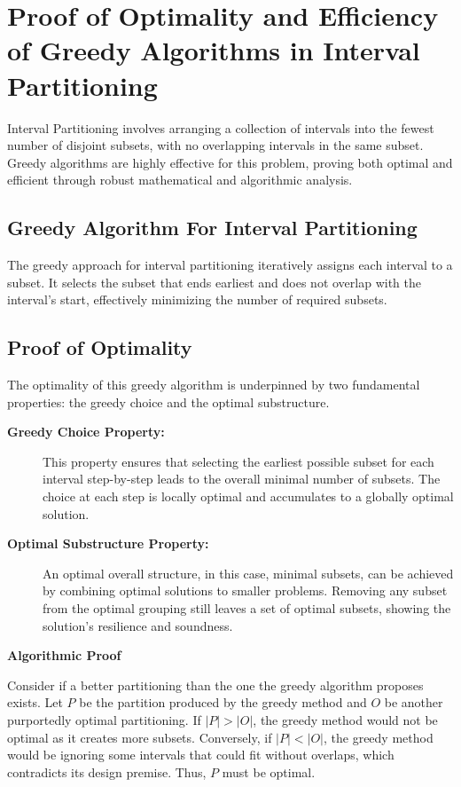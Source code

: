 \documentclass[12pt]{book} %
\begin{document}
\section{Proof of Optimality and Efficiency of Greedy Algorithms in Interval Partitioning}

Interval Partitioning involves arranging a collection of intervals into the fewest number of disjoint subsets, with no overlapping intervals in the same subset. Greedy algorithms are highly effective for this problem, proving both optimal and efficient through robust mathematical and algorithmic analysis.

\subsection{Greedy Algorithm For Interval Partitioning}

The greedy approach for interval partitioning iteratively assigns each interval to a subset. It selects the subset that ends earliest and does not overlap with the interval's start, effectively minimizing the number of required subsets.

\subsection{Proof of Optimality}

The optimality of this greedy algorithm is underpinned by two fundamental properties: the greedy choice and the optimal substructure.

\begin{description}
    \item[\textbf{Greedy Choice Property:}] This property ensures that selecting the earliest possible subset for each interval step-by-step leads to the overall minimal number of subsets. The choice at each step is locally optimal and accumulates to a globally optimal solution.
    
    \item[\textbf{Optimal Substructure Property:}] An optimal overall structure, in this case, minimal subsets, can be achieved by combining optimal solutions to smaller problems. Removing any subset from the optimal grouping still leaves a set of optimal subsets, showing the solution's resilience and soundness.
\end{description}

\textbf{Algorithmic Proof}

Consider if a better partitioning than the one the greedy algorithm proposes exists. Let \( P \) be the partition produced by the greedy method and \( O \) be another purportedly optimal partitioning. If \( |P| > |O| \), the greedy method would not be optimal as it creates more subsets. Conversely, if \( |P| < |O| \), the greedy method would be ignoring some intervals that could fit without overlaps, which contradicts its design premise. Thus, \( P \) must be optimal.
\end{document}
